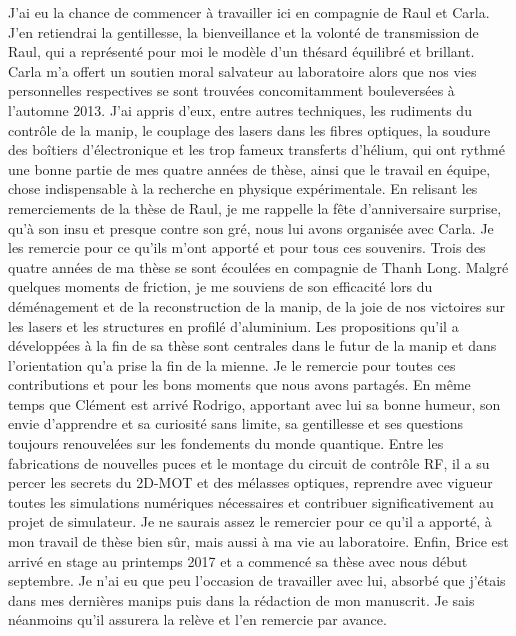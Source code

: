 \bigskip
J'ai eu la chance de commencer à travailler ici en compagnie de Raul et Carla.
J'en retiendrai la gentillesse, la bienveillance et la volonté de transmission de Raul, qui a représenté pour moi le modèle d'un thésard équilibré et brillant.
Carla m'a offert un soutien moral salvateur au laboratoire alors que nos vies personnelles respectives se sont trouvées concomitamment bouleversées  à l'automne 2013.
J'ai appris d'eux, entre autres techniques, les rudiments du contrôle de la manip, le couplage des lasers dans les fibres optiques, la soudure des boîtiers d'électronique et les trop fameux transferts d'hélium, qui ont rythmé une bonne partie de mes quatre années de thèse, ainsi que le travail en équipe, chose indispensable à la recherche en physique expérimentale.
En relisant les remerciements de la thèse de Raul, je me rappelle la fête d'anniversaire surprise, qu'à son insu et presque contre son gré, nous lui avons organisée avec Carla.
Je les remercie pour ce qu'ils m'ont apporté et pour tous ces souvenirs.
%
Trois des quatre années de ma thèse se sont écoulées en compagnie de Thanh Long.
Malgré quelques moments de friction, je me souviens de son efficacité lors du déménagement et de la reconstruction de la manip, de la joie de nos victoires sur les lasers et les structures en profilé d'aluminium.
Les propositions qu'il a développées à la fin de sa thèse sont centrales dans le futur de la manip et dans l'orientation qu'a prise la fin de la mienne.
Je le remercie pour toutes ces contributions et pour les bons moments que nous avons partagés.
%
En même temps que Clément est arrivé Rodrigo, apportant avec lui sa bonne humeur, son envie d'apprendre et sa curiosité sans limite, sa gentillesse et ses questions toujours renouvelées sur les fondements du monde quantique.
Entre les fabrications de nouvelles puces et le montage du circuit de contrôle RF, il a su percer les secrets du 2D-MOT et des mélasses optiques, reprendre avec vigueur toutes les simulations numériques nécessaires et contribuer significativement au projet de simulateur.
Je ne saurais assez le remercier pour ce qu'il a apporté, à mon travail de thèse bien sûr, mais aussi à ma vie au laboratoire.
%
Enfin, Brice est arrivé en stage au printemps 2017 et a commencé sa thèse avec nous début septembre.
Je n'ai eu que peu l'occasion de travailler avec lui, absorbé que j'étais dans mes dernières manips puis dans la rédaction de mon manuscrit.
Je sais néanmoins qu'il assurera la relève et l'en remercie par avance.

